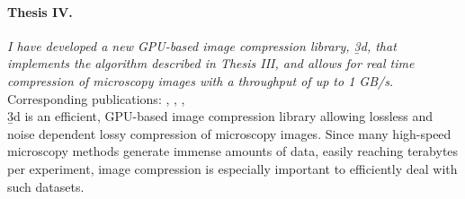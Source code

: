 \paragraph{Thesis IV.} \textit{I have  developed a new GPU-based image compression library, \b3d, that implements the algorithm described in Thesis III, and allows for real time compression of microscopy images with a throughput of up to 1 GB/s.}\\[0.5ex]
Corresponding publications: \cite{balazs_real-time_2017}, \cite{balazs_gpu-based_2016}, \cite{balazs_gpu-based_2016-1}, \cite{balazs_gpu-based_2017}\\[0.5ex]
\b3d is an efficient, GPU-based image compression library allowing lossless and noise dependent lossy compression of microscopy images. Since many high-speed microscopy methods generate immense amounts of data, easily reaching terabytes per experiment, image compression is especially important to efficiently deal with such datasets.